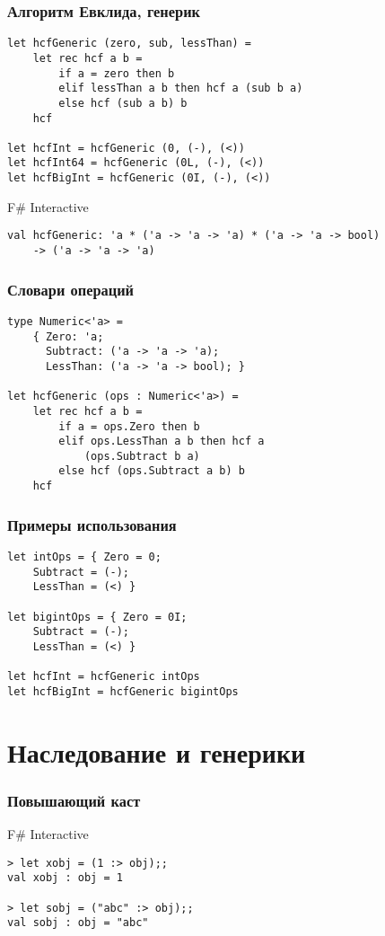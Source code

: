 \documentclass[xetex,mathserif,serif]{beamer}
\begin{document}
	\begin{frame}[fragile]
		\frametitle{Алгоритм Евклида, генерик}
		\begin{verbatim}
let hcfGeneric (zero, sub, lessThan) =
    let rec hcf a b =
        if a = zero then b
        elif lessThan a b then hcf a (sub b a)
        else hcf (sub a b) b
    hcf    
    
let hcfInt = hcfGeneric (0, (-), (<))
let hcfInt64 = hcfGeneric (0L, (-), (<))
let hcfBigInt = hcfGeneric (0I, (-), (<))
		\end{verbatim}

		\begin{alertblock}{F\# Interactive}
			\begin{verbatim}
val hcfGeneric: 'a * ('a -> 'a -> 'a) * ('a -> 'a -> bool) 
    -> ('a -> 'a -> 'a)
			\end{verbatim}
		\end{alertblock}
\end{frame}

	\begin{frame}[fragile]
		\frametitle{Словари операций}
		\begin{verbatim}
type Numeric<'a> =
    { Zero: 'a;
      Subtract: ('a -> 'a -> 'a);
      LessThan: ('a -> 'a -> bool); }

let hcfGeneric (ops : Numeric<'a>) =
    let rec hcf a b =
        if a = ops.Zero then b
        elif ops.LessThan a b then hcf a 
            (ops.Subtract b a)
        else hcf (ops.Subtract a b) b
    hcf
		\end{verbatim}
\end{frame}

	\begin{frame}[fragile]
		\frametitle{Примеры использования}
		\begin{verbatim}
let intOps = { Zero = 0; 
    Subtract = (-); 
    LessThan = (<) }
    
let bigintOps = { Zero = 0I; 
    Subtract = (-); 
    LessThan = (<) }

let hcfInt = hcfGeneric intOps
let hcfBigInt = hcfGeneric bigintOps
		\end{verbatim}
\end{frame}

	\section{Наследование и генерики}
	
	\begin{frame}[fragile]
		\frametitle{Повышающий каст}
		\begin{alertblock}{F\# Interactive}
			\begin{verbatim}
> let xobj = (1 :> obj);;
val xobj : obj = 1

> let sobj = ("abc" :> obj);;
val sobj : obj = "abc"
			\end{verbatim}
		\end{alertblock}
\end{frame}
\end{document}
